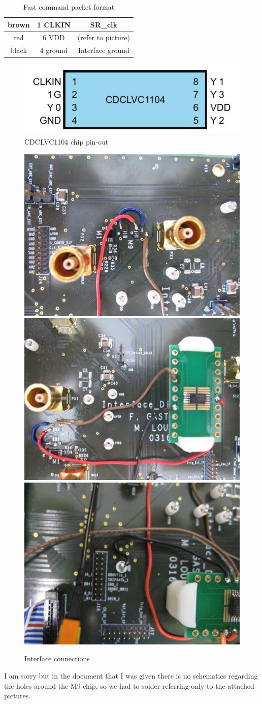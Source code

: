 \begin{enumerate}
\begin{table}[H]
\begin{tabular}{|c|c|c|}
      \hline
      brown & 1 CLKIN & SR\_clk \\
      \hline
      red & 6 VDD & (refer to picture) \\
      \hline
      black & 4 ground & Interface ground \\
      \hline
    \end{tabular}
    \egroup
    \caption{Fast command packet format}
  \end{table} 
  \begin{figure}[H]
    \centering \includegraphics[width=0.7\linewidth]{buffer-blueprint}
    \caption{CDCLVC1104 chip pin-out}\label{buffer-blueprint}
  \end{figure}
  \begin{figure}[H]
    \centering
    \includegraphics[frame,width=.3\textwidth]{interface-pinout1}\hfill
    \includegraphics[frame,width=.3\textwidth]{interface-pinout2}\hfill
    \includegraphics[frame,width=.3\textwidth]{ground}
    \caption{Interface connections}\label{interface-connections}
  \end{figure}
  I am sorry but in the document that I was given there is no
  schematics regarding the holes around the M9 chip, so we had to
  solder referring only to the attached pictures.

\end{enumerate}
